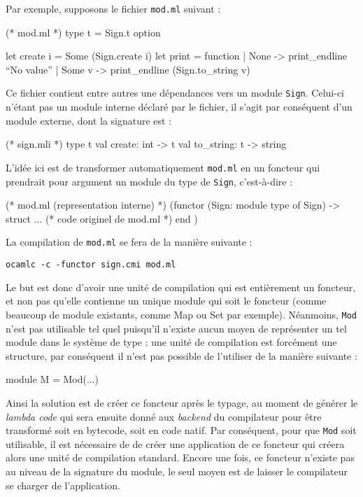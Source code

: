 \documentclass[11pt,a4paper]{report}
\begin{document}
Par exemple, supposons le fichier \texttt{mod.ml} suivant :
\begin{OCaml}
(* mod.ml *)
type t = Sign.t option

let create i = Some (Sign.create i)
let print = function
  | None -> print_endline ``No value''
  | Some v -> print_endline (Sign.to_string v)
\end{OCaml}

Ce fichier contient entre autres une dépendances vers un module
\texttt{Sign}. Celui-ci n'étant pas un module interne déclaré par le fichier, il
s'agit par conséquent d'un module externe, dont la signature est :
\begin{OCaml}
(* sign.mli *)
type t
val create: int -> t
val to_string: t -> string
\end{OCaml}

L'idée ici est de transformer automatiquement \texttt{mod.ml} en un foncteur qui
prendrait pour argument un module du type de \texttt{Sign}, c'est-à-dire :
\begin{OCaml}
(* mod.ml (representation interne) *)
(functor (Sign: module type of Sign) ->
  struct 
   ... (* code originel de mod.ml *)
  end
) 
\end{OCaml}
La compilation de \texttt{mod.ml} se fera de la manière suivante :
\begin{verbatim}
ocamlc -c -functor sign.cmi mod.ml
\end{verbatim}

Le but est donc d'avoir une unité de compilation qui est entièrement un
foncteur, et non pas qu'elle contienne un unique module qui soit le foncteur
(comme beaucoup de module existants, comme Map ou Set par exemple). Néanmoins,
\texttt{Mod} n'est pas utilisable tel quel puisqu'il n'existe aucun moyen de
représenter un tel module dans le système de type : une unité de compilation est
forcément une structure, par conséquent il n'est pas possible de l'utiliser de
la manière suivante :
\begin{OCaml}
module M = Mod(...)
\end{OCaml}
Ainsi la solution est de créer ce foncteur après le typage, au moment de générer
le \emph{lambda code} qui sera ensuite donné aux \emph{backend} du compilateur
pour être transformé soit en bytecode, soit en code natif. Par conséquent, pour
que \texttt{Mod} soit utilisable, il est nécessaire de de créer une application
de ce foncteur qui créera alors une unité de compilation standard.  Encore une
fois, ce foncteur n'existe pas au niveau de la signature du module, le seul
moyen est de laisser le compilateur se charger de l'application.
\end{document}
